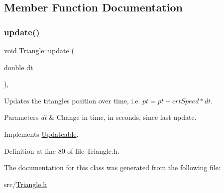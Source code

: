 \subsection{Member Function Documentation}
\mbox{\label{class_triangle_a38658aaef09315379d75dd9a36456c0e}} 
\subsubsection{\texorpdfstring{update()}{update()}}
{\footnotesize\ttfamily void Triangle\+::update (\begin{DoxyParamCaption}\item[{double}]{dt }\end{DoxyParamCaption})\hspace{0.3cm}{\ttfamily [inline]}, {\ttfamily [virtual]}}



Updates the triangle\textquotesingle{}s position over time, i.\+e. $pt = pt + crtSpeed * dt$. 


\begin{DoxyParams}{Parameters}
{\em dt} & Change in time, in seconds, since last update. \\
\hline
\end{DoxyParams}


Implements \mbox{\hyperlink{class_updateable_aedd932b85972fac4f78d4612ff7468c1}{Updateable}}.



Definition at line 80 of file Triangle.\+h.


\begin{DoxyCode}{0}

\end{DoxyCode}


The documentation for this class was generated from the following file\+:\begin{DoxyCompactItemize}
\item 
src/\mbox{\hyperlink{_triangle_8h}{Triangle.\+h}}\end{DoxyCompactItemize}
